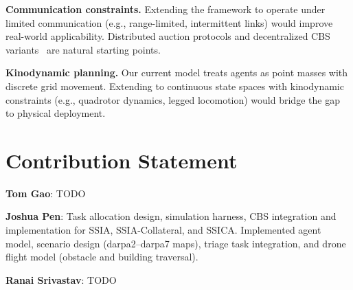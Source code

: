 \documentclass[conference]{IEEEtran}
\begin{document}
\textbf{Communication constraints.} Extending the framework to operate under limited communication (e.g., range-limited, intermittent links) would improve real-world applicability. Distributed auction protocols and decentralized CBS variants~\cite{sharon2012cbs} are natural starting points.

\textbf{Kinodynamic planning.} Our current model treats agents as point masses with discrete grid movement. Extending to continuous state spaces with kinodynamic constraints (e.g., quadrotor dynamics, legged locomotion) would bridge the gap to physical deployment.

\section*{Contribution Statement}

\textbf{Tom Gao}: TODO

\textbf{Joshua Pen}: Task allocation design, simulation harness, CBS integration and implementation for SSIA, SSIA-Collateral, and SSICA. Implemented agent model, scenario design (darpa2--darpa7 maps), triage task integration, and drone flight model (obstacle and building traversal).

\textbf{Ranai Srivastav}: TODO

\end{document}
